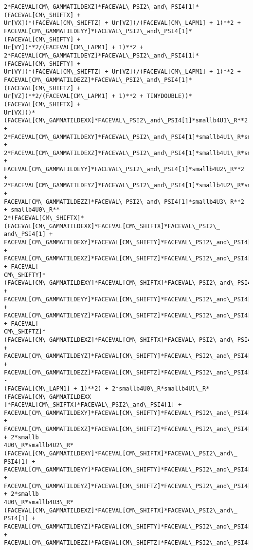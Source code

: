 \documentclass[landscape,letterpaper,10pt,english]{article}
\begin{document}
\begin{Verbatim}[commandchars=\\\{\}]
2*FACEVAL[CM\_GAMMATILDEXZ]*FACEVAL\_PSI2\_and\_PSI4[1]*(FACEVAL[CM\_SHIFTX] +
Ur[VX])*(FACEVAL[CM\_SHIFTZ] + Ur[VZ])/(FACEVAL[CM\_LAPM1] + 1)**2 +
FACEVAL[CM\_GAMMATILDEYY]*FACEVAL\_PSI2\_and\_PSI4[1]*(FACEVAL[CM\_SHIFTY] +
Ur[VY])**2/(FACEVAL[CM\_LAPM1] + 1)**2 +
2*FACEVAL[CM\_GAMMATILDEYZ]*FACEVAL\_PSI2\_and\_PSI4[1]*(FACEVAL[CM\_SHIFTY] +
Ur[VY])*(FACEVAL[CM\_SHIFTZ] + Ur[VZ])/(FACEVAL[CM\_LAPM1] + 1)**2 +
FACEVAL[CM\_GAMMATILDEZZ]*FACEVAL\_PSI2\_and\_PSI4[1]*(FACEVAL[CM\_SHIFTZ] +
Ur[VZ])**2/(FACEVAL[CM\_LAPM1] + 1)**2 + TINYDOUBLE))*(FACEVAL[CM\_SHIFTX] +
Ur[VX]))*(FACEVAL[CM\_GAMMATILDEXX]*FACEVAL\_PSI2\_and\_PSI4[1]*smallb4U1\_R**2 +
2*FACEVAL[CM\_GAMMATILDEXY]*FACEVAL\_PSI2\_and\_PSI4[1]*smallb4U1\_R*smallb4U2\_R +
2*FACEVAL[CM\_GAMMATILDEXZ]*FACEVAL\_PSI2\_and\_PSI4[1]*smallb4U1\_R*smallb4U3\_R +
FACEVAL[CM\_GAMMATILDEYY]*FACEVAL\_PSI2\_and\_PSI4[1]*smallb4U2\_R**2 +
2*FACEVAL[CM\_GAMMATILDEYZ]*FACEVAL\_PSI2\_and\_PSI4[1]*smallb4U2\_R*smallb4U3\_R +
FACEVAL[CM\_GAMMATILDEZZ]*FACEVAL\_PSI2\_and\_PSI4[1]*smallb4U3\_R**2 + smallb4U0\_R**
2*(FACEVAL[CM\_SHIFTX]*(FACEVAL[CM\_GAMMATILDEXX]*FACEVAL[CM\_SHIFTX]*FACEVAL\_PSI2\_
and\_PSI4[1] +
FACEVAL[CM\_GAMMATILDEXY]*FACEVAL[CM\_SHIFTY]*FACEVAL\_PSI2\_and\_PSI4[1] +
FACEVAL[CM\_GAMMATILDEXZ]*FACEVAL[CM\_SHIFTZ]*FACEVAL\_PSI2\_and\_PSI4[1]) + FACEVAL[
CM\_SHIFTY]*(FACEVAL[CM\_GAMMATILDEXY]*FACEVAL[CM\_SHIFTX]*FACEVAL\_PSI2\_and\_PSI4[1]
+ FACEVAL[CM\_GAMMATILDEYY]*FACEVAL[CM\_SHIFTY]*FACEVAL\_PSI2\_and\_PSI4[1] +
FACEVAL[CM\_GAMMATILDEYZ]*FACEVAL[CM\_SHIFTZ]*FACEVAL\_PSI2\_and\_PSI4[1]) + FACEVAL[
CM\_SHIFTZ]*(FACEVAL[CM\_GAMMATILDEXZ]*FACEVAL[CM\_SHIFTX]*FACEVAL\_PSI2\_and\_PSI4[1]
+ FACEVAL[CM\_GAMMATILDEYZ]*FACEVAL[CM\_SHIFTY]*FACEVAL\_PSI2\_and\_PSI4[1] +
FACEVAL[CM\_GAMMATILDEZZ]*FACEVAL[CM\_SHIFTZ]*FACEVAL\_PSI2\_and\_PSI4[1]) -
(FACEVAL[CM\_LAPM1] + 1)**2) + 2*smallb4U0\_R*smallb4U1\_R*(FACEVAL[CM\_GAMMATILDEXX
]*FACEVAL[CM\_SHIFTX]*FACEVAL\_PSI2\_and\_PSI4[1] +
FACEVAL[CM\_GAMMATILDEXY]*FACEVAL[CM\_SHIFTY]*FACEVAL\_PSI2\_and\_PSI4[1] +
FACEVAL[CM\_GAMMATILDEXZ]*FACEVAL[CM\_SHIFTZ]*FACEVAL\_PSI2\_and\_PSI4[1]) + 2*smallb
4U0\_R*smallb4U2\_R*(FACEVAL[CM\_GAMMATILDEXY]*FACEVAL[CM\_SHIFTX]*FACEVAL\_PSI2\_and\_
PSI4[1] + FACEVAL[CM\_GAMMATILDEYY]*FACEVAL[CM\_SHIFTY]*FACEVAL\_PSI2\_and\_PSI4[1] +
FACEVAL[CM\_GAMMATILDEYZ]*FACEVAL[CM\_SHIFTZ]*FACEVAL\_PSI2\_and\_PSI4[1]) + 2*smallb
4U0\_R*smallb4U3\_R*(FACEVAL[CM\_GAMMATILDEXZ]*FACEVAL[CM\_SHIFTX]*FACEVAL\_PSI2\_and\_
PSI4[1] + FACEVAL[CM\_GAMMATILDEYZ]*FACEVAL[CM\_SHIFTY]*FACEVAL\_PSI2\_and\_PSI4[1] +
FACEVAL[CM\_GAMMATILDEZZ]*FACEVAL[CM\_SHIFTZ]*FACEVAL\_PSI2\_and\_PSI4[1]))/((FACEVAL

\end{Verbatim}
\end{document}
